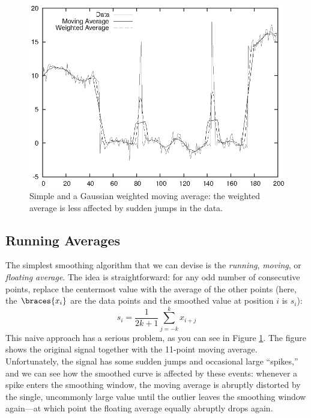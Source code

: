 \begin{figure}
  \centerline{\includegraphics{img/runningavg}}
  \caption{Simple and a Gaussian weighted moving average: the weighted
    average is less affected by sudden jumps in the data.}
  \label{fig:runningavg}
\end{figure}

\subsection{Running Averages}

 
The simplest smoothing algorithm that we can devise is the
\emph{running}, \emph{moving}, or \emph{floating average}. The
idea is straightforward: for any odd number of consecutive points, replace the
centermost value with the average of the other points (here, the
$\braces{x_i}$ are the data points and the smoothed value at position
$i$ is $s_i$):
%
\[ 
s_i = \frac{1}{2k+1} \sum_{j=-k}^k x_{i+j}
\]
%
This naive approach has a serious problem, as you can see in Figure
\ref{fig:runningavg}. The figure shows the original signal together
with the 11-point moving average. Unfortunately, the signal has some
sudden jumps and occasional large ``spikes,'' and we can see how the
smoothed curve is affected by these events: whenever a spike enters
the smoothing window, the moving average is abruptly distorted by the
single, uncommonly large value until the outlier leaves the smoothing
window again---at which point the floating average equally abruptly
drops again.




